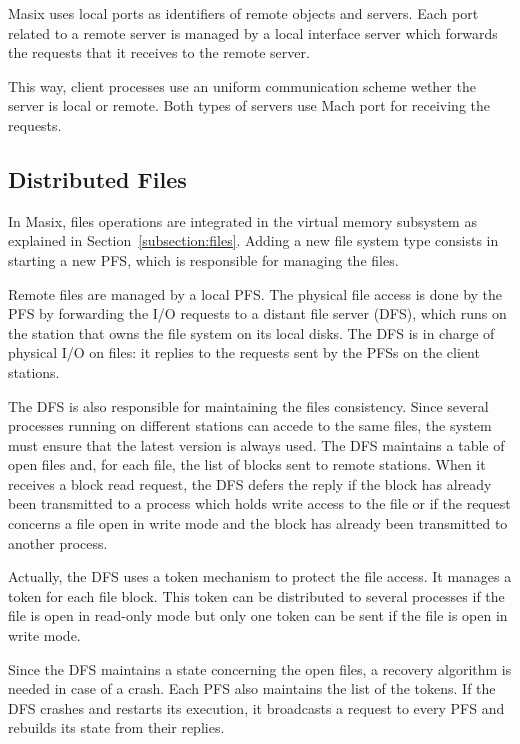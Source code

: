	Masix uses local ports as identifiers of remote objects and servers.
Each port related to a remote server is managed by a local interface server
which forwards the requests that it receives to the remote server.

	This way, client processes use an uniform communication scheme
wether the server is local or remote. Both types of servers use Mach
port for receiving the requests.

\subsection {Distributed Files}

	In Masix, files operations are integrated in the virtual memory
subsystem as explained in Section~\ref {subsection:files}. Adding a new file
system type consists in starting a new PFS, which is responsible for
managing the files.

	Remote files are managed by a local PFS. The physical file access is
done by the PFS by forwarding the I/O requests to a distant file server (DFS),
which runs on the station that owns the file system on its local disks. The
DFS is in charge of physical I/O on files: it replies to the requests sent
by the PFSs on the client stations.

	The DFS is also responsible for maintaining the files consistency.
Since several processes running on different stations can accede to the same
files, the system must ensure that the latest version is always used. The DFS
maintains a table of open files and, for each file, the list of blocks sent
to remote stations. When it receives a block read request, the DFS defers
the reply if the block has already been transmitted to a process which holds
write access to the file or if the request concerns a file open in write mode
and the block has already been transmitted to another process.

	Actually, the DFS uses a token mechanism to protect the file access. It
manages a token for each file block. This token can be distributed to
several processes if the file is open in read-only mode but only one
token can be sent if the file is open in write mode.

	Since the DFS maintains a state concerning the open files, a recovery
algorithm is needed in case of a crash. Each PFS also maintains the list of
the tokens. If the DFS crashes and restarts its execution, it broadcasts a
request to every PFS and rebuilds its state from their replies.

